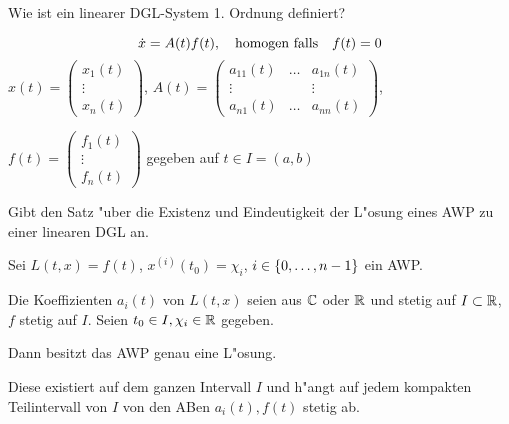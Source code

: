 \documentclass[9pt]{article}
\newcommand{\R}[1]{%
	\ifthenelse{\equal{#1}{}}
		{\mathbb{R}}
		{\mathbb{R}^#1}}%
\newcommand{\C}[1]{%
	\ifthenelse{\equal{#1}{}}
	{\mathbb{C}}
	{\mathbb{C}^#1}}%
\newenvironment{field}{}{\newpage}
\newif\ifnote
\newenvironment{note}{\notetrue}{\notefalse}
\newcommand{\localtag}{}
\newcommand{\globaltag}{}
\newcommand{\uuid}{}
\newcommand{\tags}[1]{
    \ifnote 
        \renewcommand{\localtag}{#1}
    \else
        \renewcommand{\globaltag}{#1}
    \fi 
    }
\newcommand{\xplain}[1]{\renewcommand{\uuid}{#1}}
\begin{document}
\begin{note}
	\xplain{UUID}
	\tags{definition, satz LDGL, 3.7}
	
	\begin{field}  %
		Wie ist ein linearer DGL-System 1. Ordnung definiert?
	\end{field}
	
	\begin{field}  %
		\begin{equation*}
		\dot{x} = A(t) f(t), \qq{homogen falls} f(t) =0
		\end{equation*}
		\footnotesize
		$x(t) = \begin{pmatrix}x_1(t) \\ \vdots \\ x_n(t) \end{pmatrix}$, \quad $A(t)=
			\begin{pmatrix}
				a_{11}(t) & \dots & a_{1n}(t) \\
				\vdots    &       & \vdots \\
				a_{n1}(t) & \dots & a_{nn}(t) 
			\end{pmatrix}$,
		
		
		$f(t) = 
			\begin{pmatrix}
				f_1(t) \\ \vdots \\ f_n(t)
			\end{pmatrix}$
		gegeben auf $t\in I = (a,b)$
	\end{field}
		
	\begin{field}  %
		Gibt den Satz "uber die
		Existenz und Eindeutigkeit der L"osung eines AWP zu einer linearen DGL an.
	\end{field}
	
	\begin{field}  %
		Sei $L(t,x)=f(t)$, $x^{(i)}(t_0) = \chi_i$, $i \in \qty{0,\dots, n-1}$ ein AWP.
		
		Die Koeffizienten $a_i(t)$ von $L(t,x)$ seien aus $\C{}$ oder $\R{}$ und stetig auf $I \subset \R{}$, $f$ stetig auf $I$. Seien $t_0\in I, \chi_i \in \R{}$  gegeben.
		
		 Dann besitzt das AWP genau eine L"osung.
		 
		 Diese existiert auf dem ganzen Intervall $I$ und h"angt auf jedem kompakten Teilintervall von $I$ von den ABen $a_i(t),f(t)$ stetig ab.
	\end{field}
\end{note}
\end{document}

